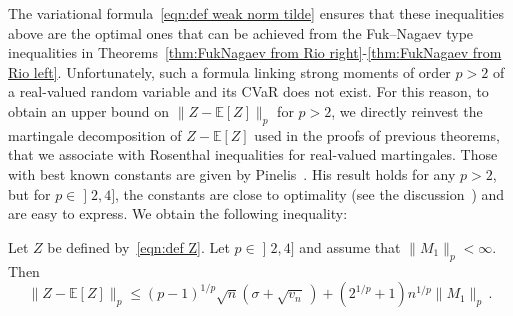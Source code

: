 \documentclass[AHL,Unicode,longabstracts,published]{cedram}
\newcommand{\bE}{\mathbb{E}}
\newcommand{\intervalleof}[2]{\mathopen{]} #1\mathclose{}\mathpunct{},#2\mathclose{]}}
\begin{document}
The variational formula~\eqref{eqn:def weak norm tilde} ensures that these inequalities above are the optimal ones that can be achieved from the Fuk--Nagaev type inequalities in Theorems~\ref{thm:FukNagaev from Rio right}-\ref{thm:FukNagaev from Rio left}. Unfortunately, such a formula linking strong moments of order $p>2$ of a real-valued random variable and its CVaR does not exist. For this reason, to obtain an upper bound on $\|Z-\bE[Z]\|_p$ for $p>2$, we directly reinvest the martingale decomposition of $Z-\bE[Z]$ used in the proofs of previous theorems, that we associate with Rosenthal inequalities for real-valued martingales. Those with best known constants are given by Pinelis~\cite[Corollary~1]{Pinelis15}. His result holds for any $p>2$, but for $p\in\intervalleof 24$, the constants are close to optimality (see the discussion~\cite[pages~701-702]{Pinelis15}) and are easy to express. We obtain the following inequality:
\begin{theo}\label{thm:Rosenthal strong}
Let $Z$ be defined by~\eqref{eqn:def Z}. Let $p\in\intervalleof 24$ and assume that $\|M_1\|_p<\infty$. Then
\[
\|Z-\bE[Z]\|_p\leq (p-1)^{1/p}\sqrt{n}(\sigma+\sqrt{v_n}\,)+(2^{1/p}+1)n^{1/p}\|M_1\|_p\,.
\]
\end{theo}
\end{document}
